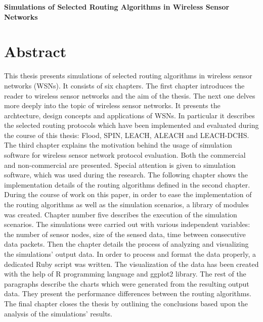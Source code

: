 \vskip 2cm


\begin{center}
\large \bf
Simulations of Selected Routing Algorithms in Wireless Sensor Networks
\end{center}

\section*{Abstract}
This thesis presents simulations of selected routing algorithms in wireless sensor networks (WSNs). It consists of six chapters. The first chapter introduces the reader to wireless sensor networks and the aim of the thesis. The next one delves more deeply into the topic of wireless sensor networks. It presents the archtecture, design concepts and applications of WSNs. In particular it describes the selected routing protocols which have been implemented and evaluated during the course of this thesis: Flood, SPIN, LEACH, ALEACH and LEACH-DCHS. The third chapter explains the motivation behind the usage of simulation software for wireless sensor network protocol evaluation. Both the commercial and non-commercial are presented. Special attention is given to \omnetpp simulation software, which was used during the research. The following chapter shows the implementation details of the routing algorithms defined in the second chapter. During the course of work on this paper, in order to ease the implementation of the routing algorithms as well as the simulation scenarios, a library of \omnetpp modules was created. Chapter number five describes the execution of the simulation scenarios. The simulations were carried out with various independent variables: the number of sensor nodes, size of the sensed data, time between consecutive data packets. Then the chapter details the process of analyzing and visualizing the simulations' output data. In order to process and format the data properly, a dedicated Ruby script was written. The visualization of the data has been created with the help of R programming language and ggplot2 library. The rest of the paragraphs describe the charts which were generated from the resulting output data. They present the performance differences between the routing algorithms. The final chapter closes the thesis by outlining the conclusions based upon the analysis of the simulations' results.    

\vfill